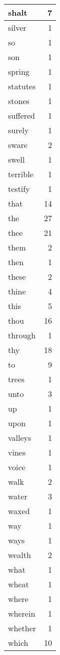 \begin{center}
\begin{longtable}{l|r}
shalt & 7 \\ \hline
silver & 1 \\ \hline
so & 1 \\ \hline
son & 1 \\ \hline
spring & 1 \\ \hline
statutes & 1 \\ \hline
stones & 1 \\ \hline
suffered & 1 \\ \hline
surely & 1 \\ \hline
sware & 2 \\ \hline
swell & 1 \\ \hline
terrible & 1 \\ \hline
testify & 1 \\ \hline
that & 14 \\ \hline
the & 27 \\ \hline
thee & 21 \\ \hline
them & 2 \\ \hline
then & 1 \\ \hline
these & 2 \\ \hline
thine & 4 \\ \hline
this & 5 \\ \hline
thou & 16 \\ \hline
through & 1 \\ \hline
thy & 18 \\ \hline
to & 9 \\ \hline
trees & 1 \\ \hline
unto & 3 \\ \hline
up & 1 \\ \hline
upon & 1 \\ \hline
valleys & 1 \\ \hline
vines & 1 \\ \hline
voice & 1 \\ \hline
walk & 2 \\ \hline
water & 3 \\ \hline
waxed & 1 \\ \hline
way & 1 \\ \hline
ways & 1 \\ \hline
wealth & 2 \\ \hline
what & 1 \\ \hline
wheat & 1 \\ \hline
where & 1 \\ \hline
wherein & 1 \\ \hline
whether & 1 \\ \hline
which & 10 \\ \hline

\end{longtable}
\end{center}
